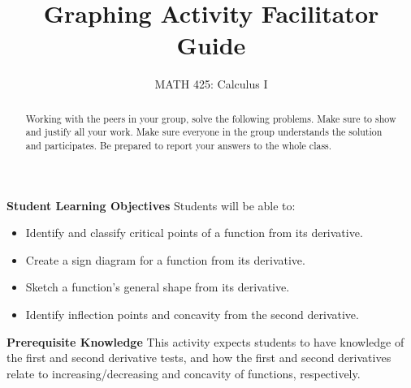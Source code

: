 \documentclass{ximera}
\title{Graphing Activity Facilitator Guide}
\author{MATH 425: Calculus I}
\begin{document}
\begin{abstract}
    Working with the peers in your group, solve the following problems. Make sure to show and justify all your work. Make sure everyone in the group understands the solution and participates. Be prepared to report your answers to the whole class. 
\end{abstract}
\maketitle

\textbf{Student Learning Objectives}
  Students will be able to:
  \begin{itemize}
    \item Identify and classify critical points of a function from its derivative.
    \item Create a sign diagram for a function from its derivative.
    \item Sketch a function's general shape from its derivative.
    \item Identify inflection points and concavity from the second derivative.
  \end{itemize}
\textbf{Prerequisite Knowledge} This activity expects students to have knowledge of the first and second derivative tests, and how the first and second derivatives relate to increasing/decreasing and concavity of functions, respectively.  
\end{document}
